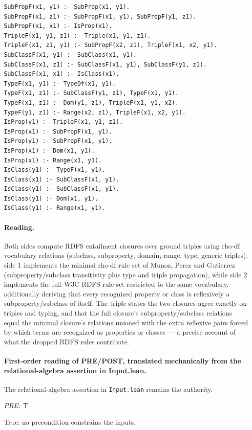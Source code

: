 \documentclass[10pt]{article}
\begin{document}
\begin{Verbatim}[fontsize=\scriptsize,breaklines=true,breakanywhere=true,frame=single,framesep=1.5mm]
SubPropF(x1, y1) :- SubProp(x1, y1).
SubPropF(x1, z1) :- SubPropF(x1, y1), SubPropF(y1, z1).
SubPropF(x1, x1) :- IsProp(x1).
TripleF(x1, y1, z1) :- Triple(x1, y1, z1).
TripleF(x1, z1, y1) :- SubPropF(x2, z1), TripleF(x1, x2, y1).
SubClassF(x1, y1) :- SubClass(x1, y1).
SubClassF(x1, z1) :- SubClassF(x1, y1), SubClassF(y1, z1).
SubClassF(x1, x1) :- IsClass(x1).
TypeF(x1, y1) :- TypeOf(x1, y1).
TypeF(x1, z1) :- SubClassF(y1, z1), TypeF(x1, y1).
TypeF(x1, z1) :- Dom(y1, z1), TripleF(x1, y1, x2).
TypeF(y1, z1) :- Range(x2, z1), TripleF(x1, x2, y1).
IsProp(y1) :- TripleF(x1, y1, z1).
IsProp(x1) :- SubPropF(x1, y1).
IsProp(y1) :- SubPropF(x1, y1).
IsProp(x1) :- Dom(x1, y1).
IsProp(x1) :- Range(x1, y1).
IsClass(y1) :- TypeF(x1, y1).
IsClass(x1) :- SubClassF(x1, y1).
IsClass(y1) :- SubClassF(x1, y1).
IsClass(y1) :- Dom(x1, y1).
IsClass(y1) :- Range(x1, y1).
\end{Verbatim}

\paragraph{Reading.} Both sides compute RDFS entailment closures over ground triples using rho-df vocabulary relations (subclass, subproperty, domain, range, type, generic triples); side 1 implements the minimal rho-df rule set of Munoz, Perez and Gutierrez (subproperty/subclass transitivity plus type and triple propagation), while side 2 implements the full W3C RDFS rule set restricted to the same vocabulary, additionally deriving that every recognized property or class is reflexively a subproperty/subclass of itself. The triple states the two closures agree exactly on triples and typing, and that the full closure's subproperty/subclass relations equal the minimal closure's relations unioned with the extra reflexive pairs forced by which terms are recognized as properties or classes --- a precise account of what the dropped RDFS rules contribute.

\paragraph{First-order reading of PRE/POST, translated mechanically from the relational-algebra assertion in Input.lean.} The relational-algebra assertion in \texttt{Input.lean} remains the authority.

\textit{PRE:} ⊤\par True; no precondition constrains the inputs.
\end{document}
